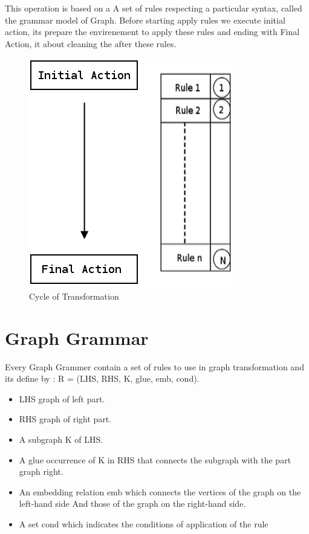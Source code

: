  
This operation is based on a A set of rules respecting a particular 
syntax, called the grammar model of Graph.
Before starting apply rules we execute initial action, 
its prepare the envirenement to apply these rules
and ending with Final Action, it about cleaning the after these rules\cite{ch3-bid, ch3-spec}.
\begin{figure}[th]
	\centering
		\includegraphics[scale=0.45]{ch3/img/transGrammar}
	\caption{\label{fig:Cycle of Tranformation}Cycle of Transformation\cite{ch3-img}}
\end{figure} 

 
\section{Graph Grammar} 
Every Graph Grammer contain a set of rules  to use in graph transformation
and its define by\cite{ch3-doc, ch3-spec} :
R = (LHS, RHS, K, glue, emb, cond). 
\begin{itemize}
\newcommand{\localtextbulletone}{\textcolor{gray}{\raisebox{.45ex}{\rule{.6ex}{.6ex}}}}
\renewcommand{\labelitemi}{\localtextbulletone}
\item LHS graph of left part.
\item RHS graph of right part.
\item A subgraph K of LHS.
\item A glue occurrence of K in RHS that connects the subgraph with the part graph  right.
\item An embedding relation emb which connects the vertices of the graph on the left-hand side
And those of the graph on the right-hand side.
\item A set cond which indicates the conditions of application of the rule
\end{itemize}

